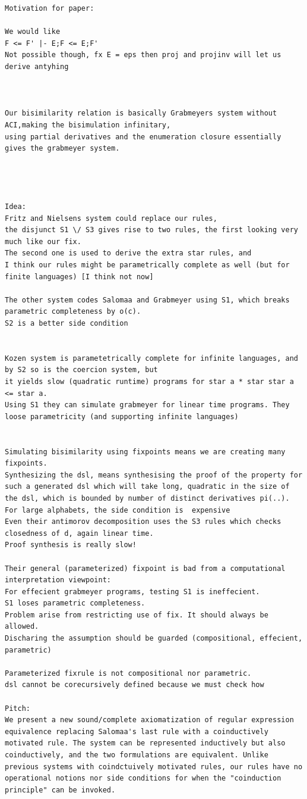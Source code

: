 \documentclass[a4paper,UKenglish,cleveref, autoref, thm-restate]{lipics-v2021}
\begin{document}
\begin{verbatim}
Motivation for paper:

We would like 
F <= F' |- E;F <= E;F'
Not possible though, fx E = eps then proj and projinv will let us derive antyhing



Our bisimilarity relation is basically Grabmeyers system without ACI,making the bisimulation infinitary,
using partial derivatives and the enumeration closure essentially gives the grabmeyer system.




Idea:
Fritz and Nielsens system could replace our rules,
the disjunct S1 \/ S3 gives rise to two rules, the first looking very much like our fix.
The second one is used to derive the extra star rules, and 
I think our rules might be parametrically complete as well (but for finite languages) [I think not now]

The other system codes Salomaa and Grabmeyer using S1, which breaks parametric completeness by o(c).
S2 is a better side condition


Kozen system is parametetrically complete for infinite languages, and by S2 so is the coercion system, but 
it yields slow (quadratic runtime) programs for star a * star star a <= star a. 
Using S1 they can simulate grabmeyer for linear time programs. They loose parametricity (and supporting infinite languages) 


Simulating bisimilarity using fixpoints means we are creating many fixpoints.
Synthesizing the dsl, means synthesising the proof of the property for such a generated dsl which will take long, quadratic in the size of the dsl, which is bounded by number of distinct derivatives pi(..).
For large alphabets, the side condition is  expensive
Even their antimorov decomposition uses the S3 rules which checks closedness of d, again linear time.
Proof synthesis is really slow!

Their general (parameterized) fixpoint is bad from a computational interpretation viewpoint:
For effecient grabmeyer programs, testing S1 is ineffecient.
S1 loses parametric completeness. 
Problem arise from restricting use of fix. It should always be allowed. 
Discharing the assumption should be guarded (compositional, effecient, parametric)

Parameterized fixrule is not compositional nor parametric.
dsl cannot be corecursively defined because we must check how 

Pitch:
We present a new sound/complete axiomatization of regular expression equivalence replacing Salomaa's last rule with a coinductively motivated rule. The system can be represented inductively but also coinductively, and the two formulations are equivalent. Unlike previous systems with coindctuively motivated rules, our rules have no operational notions nor side conditions for when the "coinduction principle" can be invoked.


\end{verbatim}
\end{document}
